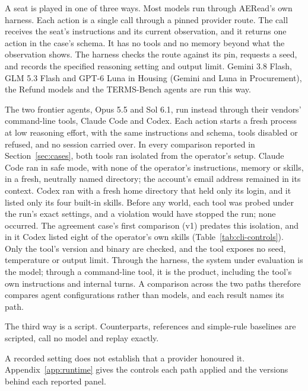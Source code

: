 A seat is played in one of three ways. Most models run through AERead's
own harness. Each action is a single call through a pinned provider route.
The call receives the seat's instructions and its current observation, and it
returns one action in the case's schema. It has no tools and no memory beyond
what the observation shows. The harness checks the route against its pin, requests a
seed, and records the specified reasoning setting and output limit.
Gemini 3.8 Flash, GLM 5.3 Flash and GPT-6 Luna in Housing (Gemini and Luna
in Procurement), the Refund models and the TERMS-Bench agents are run this
way.

The two frontier agents, Opus 5.5 and Sol 6.1, run instead through
their vendors' command-line tools, Claude Code and Codex. Each action starts a fresh process
at low reasoning effort, with the same instructions and schema, tools
disabled or refused, and no session carried over. In every comparison reported in
Section~\ref{sec:cases}, both tools ran isolated from the operator's setup.
Claude Code ran in safe mode, with none of the operator's instructions,
memory or skills, in a fresh, neutrally named directory; the account's email
address remained in its context. Codex ran with a fresh home directory that
held only its login, and it listed only its four built-in skills. Before any
world, each tool was probed under the run's exact settings, and a violation
would have stopped the run; none occurred. The agreement case's first
comparison (v1) predates this isolation, and in it Codex listed eight of the
operator's own skills (Table~\ref{tab:cli-controls}). Only the tool's version
and binary are checked, and the tool exposes no seed, temperature or output
limit. Through the harness, the system under evaluation is the model; through a
command-line tool, it is the product, including the tool's own instructions and
internal turns. A comparison across the two paths therefore compares agent
configurations rather than models, and each result names its path.

The third way is a script. Counterparts, references and simple-rule baselines
are scripted, call no model and replay exactly.

A recorded setting does not establish that a provider honoured it.
Appendix~\ref{app:runtime} gives the controls each path applied and the
versions behind each reported panel.
